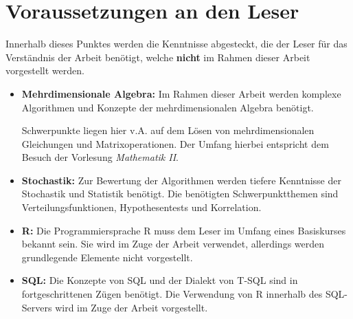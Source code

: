 \section{Voraussetzungen an den Leser}
\label{sec:Vorraussetzungen}
Innerhalb dieses Punktes werden die Kenntnisse abgesteckt, die der Leser für das Verständnis der Arbeit benötigt, welche \textbf{nicht} im Rahmen dieser Arbeit vorgestellt werden. 

\begin{itemize}
	\item \textbf{Mehrdimensionale Algebra:} Im Rahmen dieser Arbeit werden komplexe Algorithmen und Konzepte der mehrdimensionalen Algebra benötigt. 
	
	Schwerpunkte liegen hier v.A. auf dem Lösen von mehrdimensionalen Gleichungen und Matrixoperationen. Der Umfang hierbei entspricht dem Besuch der Vorlesung \textit{Mathematik II}. 
	\item \textbf{Stochastik:}  Zur Bewertung der Algorithmen werden tiefere Kenntnisse der Stochastik und Statistik benötigt. Die benötigten Schwerpunktthemen sind Verteilungsfunktionen, Hypothesentests und Korrelation. 
	\item \textbf{R:} Die Programmiersprache R muss dem Leser im Umfang eines Basiskurses bekannt sein. Sie wird im Zuge der Arbeit verwendet, allerdings werden grundlegende Elemente nicht vorgestellt. 
	\item \textbf{SQL:} Die Konzepte von SQL und der Dialekt von T-SQL sind in fortgeschrittenen Zügen benötigt. Die Verwendung von R innerhalb des SQL-Servers wird im Zuge der Arbeit vorgestellt. 
\end{itemize}
